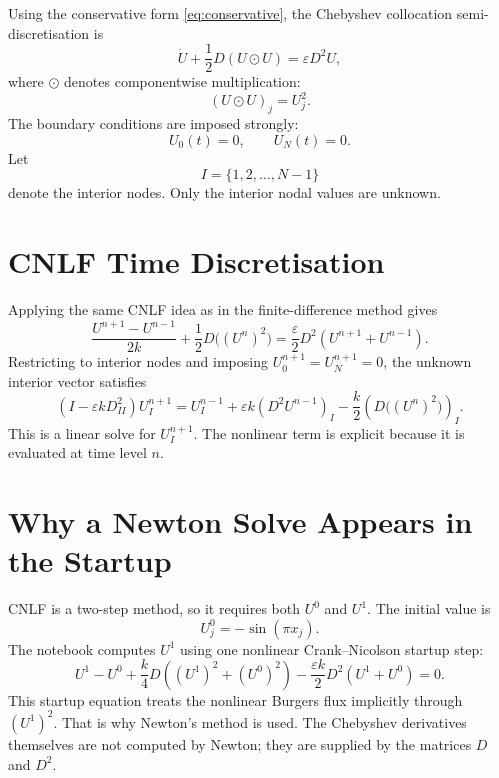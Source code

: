 \documentclass[11pt]{article}
\begin{document}
Using the conservative form \eqref{eq:conservative}, the Chebyshev collocation
semi-discretisation is
\begin{equation}
    \dot U+\frac12D(U\odot U)=\varepsilon D^2U,
    \label{eq:semi}
\end{equation}
where $\odot$ denotes componentwise multiplication:
\begin{equation}
    (U\odot U)_j=U_j^2.
\end{equation}
The boundary conditions are imposed strongly:
\begin{equation}
    U_0(t)=0,
    \qquad
    U_N(t)=0.
\end{equation}
Let
\begin{equation}
    I=\{1,2,\ldots,N-1\}
\end{equation}
denote the interior nodes.  Only the interior nodal values are unknown.

\section{CNLF Time Discretisation}

Applying the same CNLF idea as in the finite-difference method gives
\begin{equation}
    \frac{U^{n+1}-U^{n-1}}{2k}
    +
    \frac12D\bigl((U^n)^2\bigr)
    =
    \frac{\varepsilon}{2}D^2(U^{n+1}+U^{n-1}).
    \label{eq:cheb-cnlf-full}
\end{equation}
Restricting to interior nodes and imposing $U_0^{n+1}=U_N^{n+1}=0$, the unknown
interior vector satisfies
\begin{equation}
    \left(I-\varepsilon kD^2_{II}\right)U_I^{n+1}
    =
    U_I^{n-1}
    +
    \varepsilon k(D^2U^{n-1})_I
    -
    \frac{k}{2}
    \left(D\bigl((U^n)^2\bigr)\right)_I.
    \label{eq:cheb-cnlf}
\end{equation}
This is a linear solve for $U_I^{n+1}$.  The nonlinear term is explicit because it is
evaluated at time level $n$.

\section{Why a Newton Solve Appears in the Startup}

CNLF is a two-step method, so it requires both $U^0$ and $U^1$.  The initial value is
\begin{equation}
    U_j^0=-\sin(\pi x_j).
\end{equation}
The notebook computes $U^1$ using one nonlinear Crank--Nicolson startup step:
\begin{equation}
    U^1-U^0
    +
    \frac{k}{4}D\left((U^1)^2+(U^0)^2\right)
    -
    \frac{\varepsilon k}{2}D^2(U^1+U^0)
    =
    0.
    \label{eq:startup}
\end{equation}
This startup equation treats the nonlinear Burgers flux implicitly through
$(U^1)^2$.  That is why Newton's method is used.  The Chebyshev derivatives themselves
are not computed by Newton; they are supplied by the matrices $D$ and $D^2$.
\end{document}

